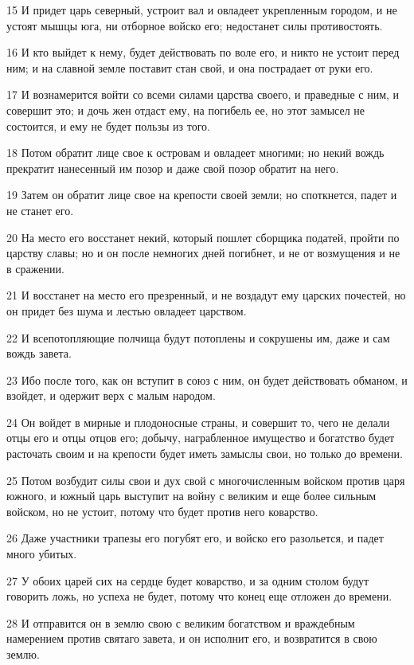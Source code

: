 \par 15 И придет царь северный, устроит вал и овладеет укрепленным городом, и не устоят мышцы юга, ни отборное войско его; недостанет силы противостоять.
\par 16 И кто выйдет к нему, будет действовать по воле его, и никто не устоит перед ним; и на славной земле поставит стан свой, и она пострадает от руки его.
\par 17 И вознамерится войти со всеми силами царства своего, и праведные с ним, и совершит это; и дочь жен отдаст ему, на погибель ее, но этот замысел не состоится, и ему не будет пользы из того.
\par 18 Потом обратит лице свое к островам и овладеет многими; но некий вождь прекратит нанесенный им позор и даже свой позор обратит на него.
\par 19 Затем он обратит лице свое на крепости своей земли; но споткнется, падет и не станет его.
\par 20 На место его восстанет некий, который пошлет сборщика податей, пройти по царству славы; но и он после немногих дней погибнет, и не от возмущения и не в сражении.
\par 21 И восстанет на место его презренный, и не воздадут ему царских почестей, но он придет без шума и лестью овладеет царством.
\par 22 И всепотопляющие полчища будут потоплены и сокрушены им, даже и сам вождь завета.
\par 23 Ибо после того, как он вступит в союз с ним, он будет действовать обманом, и взойдет, и одержит верх с малым народом.
\par 24 Он войдет в мирные и плодоносные страны, и совершит то, чего не делали отцы его и отцы отцов его; добычу, награбленное имущество и богатство будет расточать своим и на крепости будет иметь замыслы свои, но только до времени.
\par 25 Потом возбудит силы свои и дух свой с многочисленным войском против царя южного, и южный царь выступит на войну с великим и еще более сильным войском, но не устоит, потому что будет против него коварство.
\par 26 Даже участники трапезы его погубят его, и войско его разольется, и падет много убитых.
\par 27 У обоих царей сих на сердце будет коварство, и за одним столом будут говорить ложь, но успеха не будет, потому что конец еще отложен до времени.
\par 28 И отправится он в землю свою с великим богатством и враждебным намерением против святаго завета, и он исполнит его, и возвратится в свою землю.
